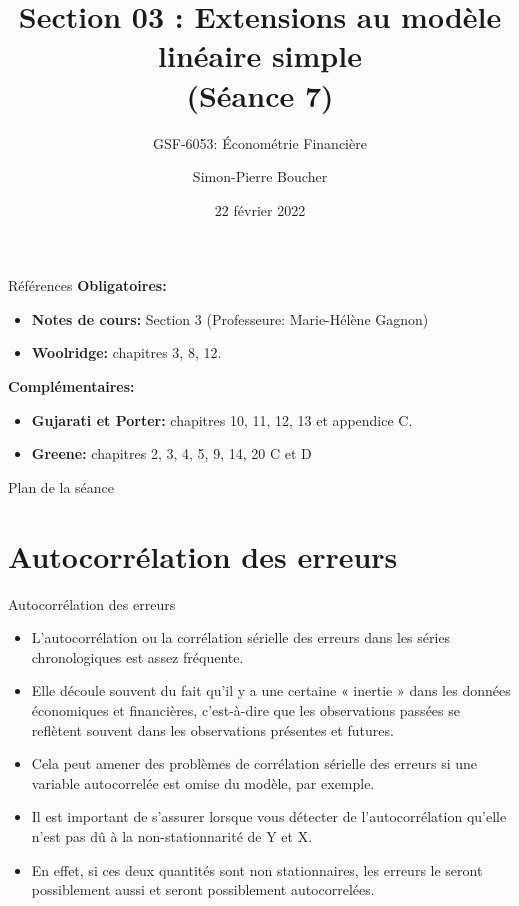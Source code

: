 \documentclass{beamer}
\title[S03 Extensions MLS]{Section 03 : Extensions au modèle linéaire simple\\ (Séance 7)}
\subtitle{GSF-6053: Économétrie Financière}
\author[SP. Boucher]{Simon-Pierre Boucher\inst{1}}
\institute[Université Laval]
{
  \inst{1}%
  Département de finance, assurance et immobilier\\
  Faculté des sciences de l'administration\\
  Université Laval}
\date[Hiver 2022]{22 février 2022}
\begin{document}
\begin{frame}
  \titlepage
\end{frame}

\begin{frame}{Références}
\textbf{Obligatoires:}
\begin{itemize}
\item \textbf{Notes de cours:} Section 3 (Professeure: Marie-Hélène Gagnon)
\item \textbf{Woolridge:} chapitres 3, 8, 12.
\end{itemize}
\vspace{0.5cm}
\textbf{Complémentaires:}
\begin{itemize}
\item \textbf{Gujarati et Porter:} chapitres 10, 11, 12, 13 et appendice C.
\item \textbf{Greene:} chapitres 2, 3, 4, 5, 9, 14, 20 C et D
\end{itemize}
\end{frame}


\begin{frame}{Plan de la séance}
  \tableofcontents
\end{frame}

\section{Autocorrélation des erreurs}

\frame{\tableofcontents[current]}


\begin{frame}{Autocorrélation des erreurs}
\begin{itemize}
\item L’autocorrélation ou la corrélation sérielle des erreurs dans les séries chronologiques est assez fréquente. 
\item Elle découle souvent du fait qu’il y a une certaine « inertie » dans les données économiques et financières, c’est-à-dire que les observations passées se reflètent souvent dans les observations présentes et futures. 
\item Cela peut amener des problèmes de corrélation sérielle des erreurs si une variable autocorrelée est omise du modèle, par exemple.
\item Il est important de s’assurer lorsque vous détecter de l’autocorrélation qu’elle n’est pas dû à la non-stationnarité de Y et X. 
\item En effet, si ces deux quantités sont non stationnaires, les erreurs le seront possiblement aussi et seront possiblement autocorrelées.

\end{itemize}
\end{frame}
\end{document}
